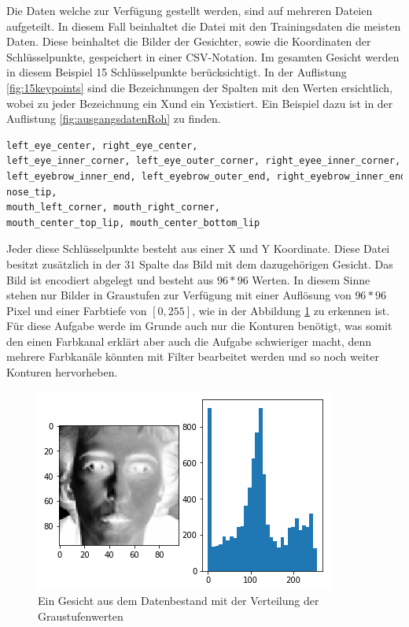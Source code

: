 Die Daten welche zur Verfügung gestellt werden, sind auf mehreren Dateien aufgeteilt. 
In diesem Fall beinhaltet die Datei mit den Trainingsdaten die meisten Daten. 
Diese beinhaltet die Bilder der Gesichter, sowie die Koordinaten der Schlüsselpunkte, gespeichert in einer CSV-Notation.
Im gesamten Gesicht werden in diesem Beispiel 15 Schlüsselpunkte berücksichtigt. 
In der Auflistung \ref{fig:15keypoints} sind die Bezeichnungen der Spalten mit den Werten ersichtlich, wobei zu jeder Bezeichnung ein \glqq X\grqq und ein \glqq Y\grqq existiert.
Ein Beispiel dazu ist in der Auflistung \ref{fig:ausgangsdatenRoh} zu finden.
\begin{lstlisting}[caption={$15$ Schlüsselpunkte im Gesicht eines Menschen},label=fig:15keypoints,captionpos=b,language=Python]
left_eye_center, right_eye_center, 
left_eye_inner_corner, left_eye_outer_corner, right_eyee_inner_corner, right_eye_outer_corner, 
left_eyebrow_inner_end, left_eyebrow_outer_end, right_eyebrow_inner_end, right_eyebrow_outer_end, 
nose_tip, 
mouth_left_corner, mouth_right_corner, 
mouth_center_top_lip, mouth_center_bottom_lip
\end{lstlisting}
Jeder diese Schlüsselpunkte besteht aus einer X und Y Koordinate. 
Diese Datei besitzt zusätzlich in der $31$ Spalte das Bild mit dem dazugehörigen Gesicht.
Das Bild ist encodiert abgelegt und besteht aus $96 * 96$ Werten. 
In diesem Sinne stehen nur Bilder in Graustufen zur Verfügung mit einer Auflösung von $96 * 96$ Pixel und einer Farbtiefe von $[0, 255]$, wie in der Abbildung \ref{fig:ausgangsdaten} zu erkennen ist. 
Für diese Aufgabe werde im Grunde auch nur die Konturen benötigt, was somit den einen Farbkanal erklärt aber auch die Aufgabe schwieriger macht, denn mehrere Farbkanäle könnten mit Filter bearbeitet werden und so noch weiter Konturen hervorheben. 
\begin{figure}
	\centering
	\includegraphics[scale=0.75]{images/ausgangsDaten.png}
	\caption{Ein Gesicht aus dem Datenbestand mit der Verteilung der Graustufenwerten}
	\label{fig:ausgangsdaten}
\end{figure}

